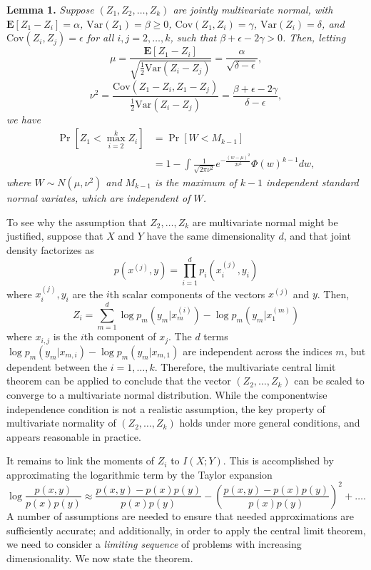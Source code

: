 \documentclass{article}
\newcommand{\E}{\textbf{E}}
\newcommand{\Cov}{\text{Cov}}
\newcommand{\Var}{\text{Var}}
\begin{document}
\textbf{Lemma 1. }
\emph{
Suppose $(Z_1, Z_2, \hdots, Z_k)$ are jointly multivariate normal, with 
$\E[Z_1 - Z_i]= \alpha$, 
$\Var(Z_1) = \beta \geq 0$, 
$\Cov(Z_1, Z_i) = \gamma$, 
$\Var(Z_i)= \delta$, and $\Cov(Z_i, Z_j) = \epsilon$ for all $i, j = 2, \hdots,
k$, such that $\beta + \epsilon - 2\gamma > 0$.  Then, letting
\[
\mu = \frac{\E[Z_1 - Z_i]}{\sqrt{\frac{1}{2}\Var(Z_i - Z_j)}} = \frac{\alpha}{\sqrt{\delta - \epsilon}},
\]
\[
\nu^2 = \frac{\Cov(Z_1 -Z_i, Z_1 - Z_j)}{\frac{1}{2}\Var(Z_i - Z_j)} = \frac{\beta + \epsilon - 2\gamma}{\delta - \epsilon},
\]
we have
\begin{align*}
\Pr[Z_1 < \max_{i=2}^k Z_i] &= \Pr[W < M_{k-1}]
\\&= 1 - \int \frac{1}{\sqrt{2\pi\nu^2}} e^{-\frac{(w-\mu)^2}{2\nu^2}} \Phi(w)^{k-1} dw,
\end{align*}
where $W \sim N(\mu, \nu^2)$ and $M_{k-1}$ is the maximum of $k-1$
independent standard normal variates, which are independent of $W$.
}

To see why the assumption that $Z_2,\hdots, Z_k$ are multivariate normal might be justified, suppose that $X$ and $Y$ have the same dimensionality $d$, and that
joint density factorizes as
\[
p(x^{(j)}, y) = \prod_{i=1}^d p_i(x^{(j)}_i, y_i)
\]
where $x_i^{(j)}, y_i$ are the $i$th scalar components of the vectors $x^{(j)}$ and $y$.
Then,
\[
Z_i = \sum_{m=1}^d \log p_m(y_m | x^{(i)}_m) - \log p_m(y_m | x^{(m)}_1)
\]
where $x_{i, j}$ is the $i$th component of $x_j$.  The $d$ terms $\log
p_m(y_m | x_{m, i}) - \log p_m(y_m | x_{m, 1})$ are independent across
the indices $m$, but dependent between the $i = 1,\hdots, k$.
Therefore, the multivariate central limit theorem can be applied to
conclude that the vector $(Z_2,\hdots, Z_k)$ can be scaled to converge
to a multivariate normal distribution.  While the componentwise
independence condition is not a realistic assumption, the key property
of multivariate normality of $(Z_2,\hdots, Z_k)$ holds under more
general conditions, and appears reasonable in practice.

It remains to link the moments of $Z_i$ to $I(X;Y)$.  This is accomplished by approximating the logarithmic term by the Taylor expansion
\[
\log \frac{p(x, y)}{p(x) p(y)} \approx \frac{p(x, y) - p(x) p(y)}{p(x) p(y)} - \left(\frac{p(x, y) - p(x) p(y)}{p(x) p(y)}\right)^2 + \hdots.
\]
A number of assumptions are needed to ensure that needed
approximations are sufficiently accurate; and additionally, in order
to apply the central limit theorem, we need to consider a
\emph{limiting sequence} of problems with increasing dimensionality.
We now state the theorem.
\end{document}
